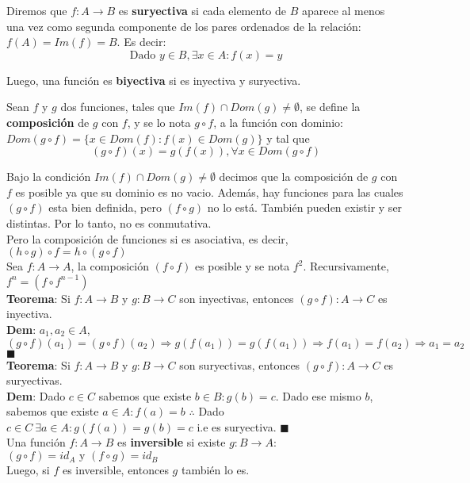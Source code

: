 \documentclass[11pt,a4paper]{article}
\newcommand*{\QEDA}{\null\nobreak\hfill\ensuremath{\blacksquare}}
\begin{document}
\noindent Diremos que $f : A \rightarrow B$ es \textbf{suryectiva} si cada elemento de $B$ aparece al menos una vez como segunda componente de los pares ordenados de la relaci\'on: $f(A) = Im(f) = B$. Es decir:$$ \text{Dado } y \in B, \exists x \in A : f(x) = y $$


\noindent Luego, una funci\'on es \textbf{biyectiva} si es inyectiva y suryectiva.

\newpage

\noindent Sean $f$ y $g$ dos funciones, tales que $Im(f) \cap Dom(g) \not = \emptyset$, se define la \textbf{composici\'on} de $g$ con $f$, y se lo nota $g \circ f$, a la funci\'on con dominio: $Dom (g \circ f) = \{ x \in Dom(f) : f(x) \in Dom(g) \}$ y tal que $$(g \circ f) (x) = g(f(x)), \forall x \in Dom(g \circ f)$$

\noindent Bajo la condici\'on $Im(f) \cap Dom(g) \not = \emptyset$ decimos que la composici\'on de $g$ con $f$ es posible ya que su dominio es no vacio. Adem\'as, hay funciones para las cuales $(g\circ f)$ esta bien definida, pero $(f\circ g)$ no lo est\'a. Tambi\'en pueden existir y ser distintas. Por lo tanto, no es conmutativa.\\

\noindent Pero la composici\'on de funciones si es asociativa, es decir, $(h \circ g) \circ f = h \circ (g \circ f)$\\

\noindent Sea $f: A \rightarrow A$, la composici\'on $(f \circ f)$ es posible y se nota $f^2$. Recursivamente, $f^n = (f \circ f^{n-1})$\\

\noindent \textbf{Teorema}: Si $f: A \rightarrow B$ y $g: B \rightarrow C$ son inyectivas, entonces $(g \circ f) : A \rightarrow C$ es inyectiva.\\
\textbf{Dem}: $a_1, a_2 \in A$, $(g \circ f)(a_1) = (g \circ f)(a_2) \Rightarrow g(f(a_1)) = g(f(a_1)) \Rightarrow f(a_1) = f(a_2) \Rightarrow a_1 = a_2$ \QEDA\\

\noindent \textbf{Teorema}: Si $f: A \rightarrow B$ y $g: B \rightarrow C$ son suryectivas, entonces $(g \circ f) : A \rightarrow C$ es suryectivas.\\
\textbf{Dem}: Dado $c\in C$ sabemos que existe $b \in B : g(b)=c$. Dado ese mismo $b$, sabemos que existe $a\in A : f(a)=b$ $\therefore$ Dado $c \in C\ \exists a \in A : g(f(a)) = g(b) = c$ i.e es suryectiva. \QEDA\\

\noindent Una funci\'on $f : A \rightarrow B$ es \textbf{inversible} si existe $g : B \rightarrow A :$ $(g\circ f) = id_A \text{  y  } (f\circ g) = id_B$\\
Luego, si $f$ es inversible, entonces $g$ tambi\'en lo es.\\
\end{document}
